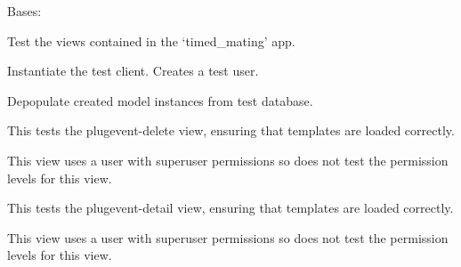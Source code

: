 \documentclass[letterpaper,10pt,english]{sphinxmanual}
\begin{document}
\begin{fulllineitems}
\label{api:timed_mating.tests.Timed_MatingViewTests}
Bases: 

Test the views contained in the `timed\_mating' app.


\begin{fulllineitems}
\label{api:timed_mating.tests.Timed_MatingViewTests.setUp}
Instantiate the test client.  Creates a test user.

\end{fulllineitems}



\begin{fulllineitems}
\label{api:timed_mating.tests.Timed_MatingViewTests.tearDown}
Depopulate created model instances from test database.

\end{fulllineitems}



\begin{fulllineitems}
\label{api:timed_mating.tests.Timed_MatingViewTests.test_plugevent_delete}
This tests the plugevent-delete view, ensuring that templates are loaded correctly.

This view uses a user with superuser permissions so does not test the permission levels for this view.

\end{fulllineitems}



\begin{fulllineitems}
\label{api:timed_mating.tests.Timed_MatingViewTests.test_plugevent_detail}
This tests the plugevent-detail view, ensuring that templates are loaded correctly.

This view uses a user with superuser permissions so does not test the permission levels for this view.


\end{fulllineitems}
\end{fulllineitems}
\end{document}
